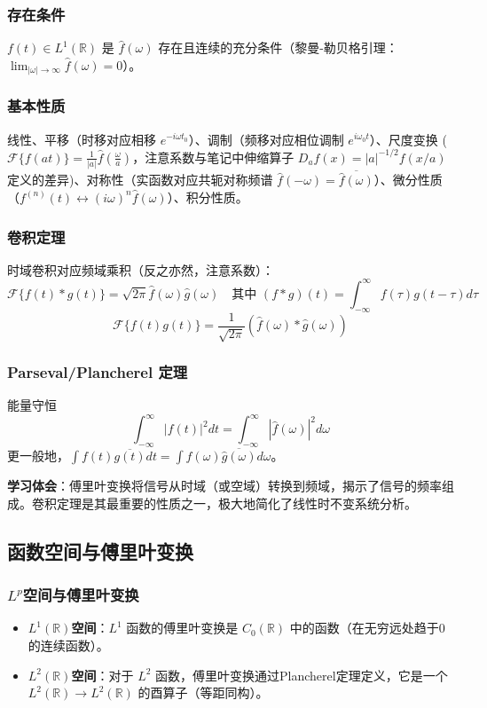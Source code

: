 \documentclass[UTF8]{ctexart}
\begin{document}
	\subsubsection{存在条件}
	$f(t) \in L^1(\mathbb{R})$ 是 $\hat{f}(\omega)$ 存在且连续的充分条件（黎曼-勒贝格引理：$\lim_{|\omega|\to\infty} \hat{f}(\omega) = 0$）。
	
	\subsubsection{基本性质}
	线性、平移（时移对应相移 $e^{-i\omega t_0}$）、调制（频移对应相位调制 $e^{i\omega_0 t}$）、尺度变换 ($\mathcal{F}\{f(at)\} = \frac{1}{|a|}\hat{f}(\frac{\omega}{a})$，注意系数与笔记中伸缩算子 $D_a f(x) = |a|^{-1/2}f(x/a)$ 定义的差异)、对称性（实函数对应共轭对称频谱 $\hat{f}(-\omega) = \overline{\hat{f}(\omega)}$）、微分性质（$f^{(n)}(t) \leftrightarrow (i\omega)^n \hat{f}(\omega)$）、积分性质。
	
	\subsubsection{卷积定理}
	时域卷积对应频域乘积（反之亦然，注意系数）：
	\[ \mathcal{F}\{f(t) * g(t)\} = \sqrt{2\pi} \hat{f}(\omega) \hat{g}(\omega) \quad \text{其中 } (f*g)(t) = \int_{-\infty}^{\infty} f(\tau)g(t-\tau)d\tau \]
	\[ \mathcal{F}\{f(t) g(t)\} = \frac{1}{\sqrt{2\pi}} (\hat{f}(\omega) * \hat{g}(\omega)) \]
	
	\subsubsection{Parseval/Plancherel 定理}
	能量守恒
	\[ \int_{-\infty}^{\infty} |f(t)|^2 dt = \int_{-\infty}^{\infty} |\hat{f}(\omega)|^2 d\omega \]
	更一般地，$\int f(t)\overline{g(t)}dt = \int \hat{f}(\omega)\overline{\hat{g}(\omega)}d\omega$。
	
	\textbf{学习体会}：傅里叶变换将信号从时域（或空域）转换到频域，揭示了信号的频率组成。卷积定理是其最重要的性质之一，极大地简化了线性时不变系统分析。
	
	\subsection{函数空间与傅里叶变换}
	\subsubsection{$L^p$空间与傅里叶变换}
	\begin{itemize}
		\item \textbf{$L^1(\mathbb{R})$空间}：$L^1$ 函数的傅里叶变换是 $C_0(\mathbb{R})$ 中的函数（在无穷远处趋于0的连续函数）。
		\item \textbf{$L^2(\mathbb{R})$空间}：对于 $L^2$ 函数，傅里叶变换通过Plancherel定理定义，它是一个 $L^2(\mathbb{R}) \to L^2(\mathbb{R})$ 的酉算子（等距同构）。
	\end{itemize}
	
\end{document}
